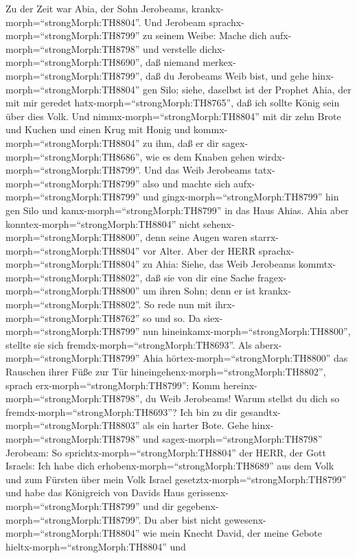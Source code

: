  Zu der Zeit war Abia, der Sohn Jerobeams,
krankx-morph=``strongMorph:TH8804''.  Und Jerobeam
sprachx-morph=``strongMorph:TH8799'' zu seinem Weibe: Mache dich
aufx-morph=``strongMorph:TH8798'' und verstelle
dichx-morph=``strongMorph:TH8690'', daß niemand
merkex-morph=``strongMorph:TH8799'', daß du Jerobeams Weib bist, und
gehe hinx-morph=``strongMorph:TH8804'' gen Silo; siehe, daselbst ist der
Prophet Ahia, der mit mir geredet hatx-morph=``strongMorph:TH8765'', daß
ich sollte König sein über dies Volk.  Und
nimmx-morph=``strongMorph:TH8804'' mit dir zehn Brote und Kuchen und
einen Krug mit Honig und kommx-morph=``strongMorph:TH8804'' zu ihm, daß
er dir sagex-morph=``strongMorph:TH8686'', wie es dem Knaben gehen
wirdx-morph=``strongMorph:TH8799''.  Und das Weib Jerobeams
tatx-morph=``strongMorph:TH8799'' also und machte sich
aufx-morph=``strongMorph:TH8799'' und gingx-morph=``strongMorph:TH8799''
hin gen Silo und kamx-morph=``strongMorph:TH8799'' in das Haus Ahias.
Ahia aber konntex-morph=``strongMorph:TH8804'' nicht
sehenx-morph=``strongMorph:TH8800'', denn seine Augen waren
starrx-morph=``strongMorph:TH8804'' vor Alter.  Aber der
HERR sprachx-morph=``strongMorph:TH8804'' zu Ahia: Siehe, das Weib
Jerobeams kommtx-morph=``strongMorph:TH8802'', daß sie von dir eine
Sache fragex-morph=``strongMorph:TH8800'' um ihren Sohn; denn er ist
krankx-morph=``strongMorph:TH8802''. So rede nun mit
ihrx-morph=``strongMorph:TH8762'' so und so. Da
siex-morph=``strongMorph:TH8799'' nun
hineinkamx-morph=``strongMorph:TH8800'', stellte sie sich
fremdx-morph=``strongMorph:TH8693''.  Als
aberx-morph=``strongMorph:TH8799'' Ahia
hörtex-morph=``strongMorph:TH8800'' das Rauschen ihrer Füße zur Tür
hineingehenx-morph=``strongMorph:TH8802'', sprach
erx-morph=``strongMorph:TH8799'': Komm
hereinx-morph=``strongMorph:TH8798'', du Weib Jerobeams! Warum stellst
du dich so fremdx-morph=``strongMorph:TH8693''? Ich bin zu dir
gesandtx-morph=``strongMorph:TH8803'' als ein harter Bote. 
Gehe hinx-morph=``strongMorph:TH8798'' und
sagex-morph=``strongMorph:TH8798'' Jerobeam: So
sprichtx-morph=``strongMorph:TH8804'' der HERR, der Gott Israels: Ich
habe dich erhobenx-morph=``strongMorph:TH8689'' aus dem Volk und zum
Fürsten über mein Volk Israel gesetztx-morph=``strongMorph:TH8799''
 und habe das Königreich von Davids Haus
gerissenx-morph=``strongMorph:TH8799'' und dir
gegebenx-morph=``strongMorph:TH8799''. Du aber bist nicht
gewesenx-morph=``strongMorph:TH8804'' wie mein Knecht David, der meine
Gebote hieltx-morph=``strongMorph:TH8804'' und
